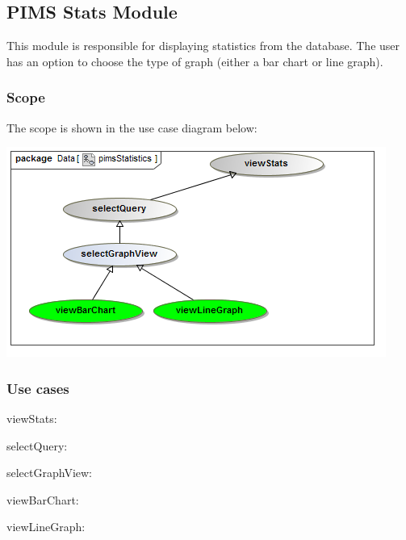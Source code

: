 \subsection{PIMS Stats Module}
This module is responsible for displaying statistics from the database. The user has an option to choose the type of graph (either a bar chart or line graph). \par 

\subsubsection{Scope}
The scope is shown in the use case diagram below: \par
\includegraphics[width=0.75\linewidth]{./Graphics/pimsStats/pimsStatistics}

\subsubsection{Use cases}
\begin{description}
	\item{viewStats:} 
	\item{selectQuery:}
	\item{selectGraphView:}
	\item{viewBarChart:}
	\item{viewLineGraph:}  
\end{description}